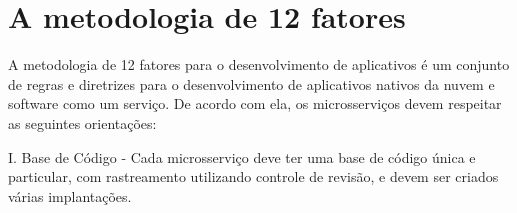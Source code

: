 \section{A metodologia de 12 fatores}

A metodologia de 12 fatores para o desenvolvimento de aplicativos é um conjunto de regras e diretrizes para o desenvolvimento de aplicativos nativos da nuvem e software como um serviço. De acordo com ela, os microsserviços devem respeitar as seguintes orientações: 









I. Base de Código - Cada microsserviço deve ter uma base de código única e particular, com rastreamento utilizando controle de revisão, e devem ser criados várias implantações.

